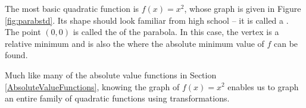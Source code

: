 The most basic quadratic function is $f(x) = x^2$, whose graph is given in Figure \ref{fig:parabstd}. Its shape should look familiar from high school -- it is called a . The point $(0,0)$ is called the   of the parabola.  In this case, the vertex is a relative minimum and is also the where the absolute minimum value of $f$ can be found. 


Much like many of the absolute value functions in Section \ref{AbsoluteValueFunctions}, knowing the graph of $f(x) = x^2$ enables us to graph an entire family of quadratic functions using transformations.

\medskip


